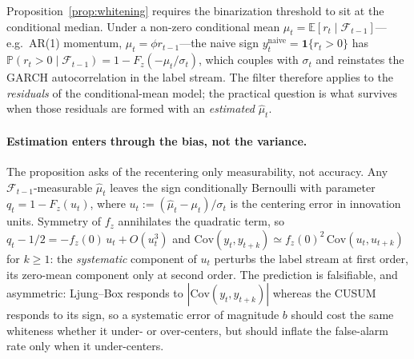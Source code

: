 \documentclass[sigconf,anonymous,review]{acmart}
\theoremstyle{acmdefinition}
\begin{document}
Proposition~\ref{prop:whitening} requires the binarization threshold to sit at the conditional median. Under a non-zero conditional mean $\mu_t = \mathbb{E}[r_t \mid \mathcal{F}_{t-1}]$---e.g.\ AR(1) momentum, $\mu_t = \phi r_{t-1}$---the naive sign $y^{\mathrm{naive}}_t = \mathbf{1}\{r_t > 0\}$ has $\mathbb{P}(r_t > 0 \mid \mathcal{F}_{t-1}) = 1 - F_z(-\mu_t/\sigma_t)$, which couples with $\sigma_t$ and reinstates the GARCH autocorrelation in the label stream. The filter therefore applies to the \emph{residuals} of the conditional-mean model; the practical question is what survives when those residuals are formed with an \emph{estimated} $\hat{\mu}_t$.

\paragraph{Estimation enters through the bias, not the variance.}
The proposition asks of the recentering only measurability, not accuracy. Any $\mathcal{F}_{t-1}$-measurable $\hat{\mu}_t$ leaves the sign conditionally Bernoulli with parameter $q_t = 1 - F_z(u_t)$, where $u_t := (\hat{\mu}_t - \mu_t)/\sigma_t$ is the centering error in innovation units. Symmetry of $f_z$ annihilates the quadratic term, so $q_t - 1/2 = -f_z(0)\,u_t + O(u_t^3)$ and $\mathrm{Cov}(y_t, y_{t+k}) \simeq f_z(0)^2\,\mathrm{Cov}(u_t, u_{t+k})$ for $k \geq 1$: the \emph{systematic} component of $u_t$ perturbs the label stream at first order, its zero-mean component only at second order. The prediction is falsifiable, and asymmetric: Ljung--Box responds to $|\mathrm{Cov}(y_t, y_{t+k})|$ whereas the CUSUM responds to its sign, so a systematic error of magnitude $b$ should cost the same whiteness whether it under- or over-centers, but should inflate the false-alarm rate only when it under-centers.
\end{document}
